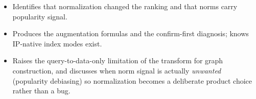 \begin{interviewq}

\goodgreat
\begin{itemize}
    \item {} Identifies that normalization changed the ranking and that norms carry popularity signal.
    \item {} Produces the augmentation formulas and the confirm-first diagnosis; knows IP-native index modes exist.
    \item {} Raises the query-to-data-only limitation of the transform for graph construction, and discusses when norm signal is actually \emph{unwanted} (popularity debiasing) so normalization becomes a deliberate product choice rather than a bug.
\end{itemize}

\end{interviewq}



